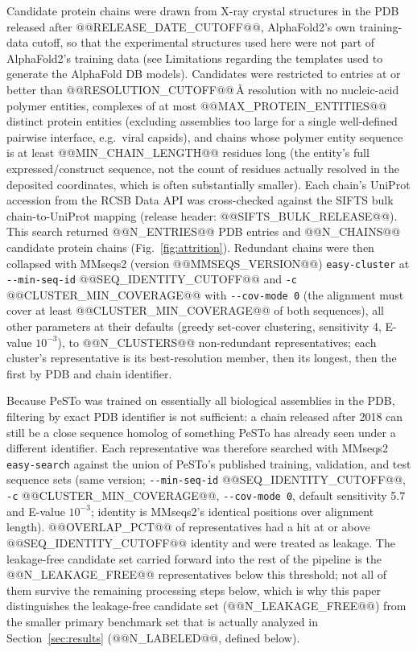 \documentclass[10pt]{article}
\begin{document}
Candidate protein chains were drawn from X-ray crystal structures in the PDB
released after @@RELEASE_DATE_CUTOFF@@, AlphaFold2's own training-data
cutoff, so that the experimental structures used here were not part of
AlphaFold2's training data (see Limitations regarding the templates used to
generate the AlphaFold DB models). Candidates were restricted to entries at
or better than @@RESOLUTION_CUTOFF@@\,\r{A} resolution with no nucleic-acid
polymer entities, complexes of at most @@MAX_PROTEIN_ENTITIES@@ distinct
protein entities (excluding assemblies too large for a single well-defined
pairwise interface, e.g.\ viral capsids), and chains whose polymer entity
sequence is at least @@MIN_CHAIN_LENGTH@@ residues long (the entity's full
expressed/construct sequence, not the count of residues actually resolved in
the deposited coordinates, which is often substantially smaller). Each
chain's UniProt accession from the RCSB Data API was cross-checked against
the SIFTS \cite{velankar2013} bulk chain-to-UniProt mapping (release
header: @@SIFTS_BULK_RELEASE@@). This search returned @@N_ENTRIES@@ PDB
entries and @@N_CHAINS@@ candidate protein chains (Fig.~\ref{fig:attrition}).
Redundant chains were then collapsed with MMseqs2 \cite{steinegger2017}
(version @@MMSEQS_VERSION@@) \texttt{easy-cluster} at
\texttt{-{}-min-seq-id} @@SEQ_IDENTITY_CUTOFF@@ and \texttt{-c}
@@CLUSTER_MIN_COVERAGE@@ with \texttt{-{}-cov-mode 0} (the alignment must cover
at least @@CLUSTER_MIN_COVERAGE@@ of both sequences), all other parameters at
their defaults (greedy set-cover clustering, sensitivity 4, E-value
$10^{-3}$), to @@N_CLUSTERS@@ non-redundant representatives; each cluster's
representative is its best-resolution member, then its longest, then the
first by PDB and chain identifier.

Because PeSTo was trained on essentially all biological assemblies in the PDB,
filtering by exact PDB identifier is not sufficient: a chain released after
2018 can still be a close sequence homolog of something PeSTo has already seen
under a different identifier. Each representative was therefore searched with
MMseqs2 \texttt{easy-search} against the union of PeSTo's published training,
validation, and test sequence sets (same version; \texttt{-{}-min-seq-id}
@@SEQ_IDENTITY_CUTOFF@@, \texttt{-c} @@CLUSTER_MIN_COVERAGE@@,
\texttt{-{}-cov-mode 0}, default sensitivity 5.7 and E-value $10^{-3}$;
identity is MMseqs2's identical positions over alignment length).
@@OVERLAP_PCT@@ of representatives had a hit at or above
@@SEQ_IDENTITY_CUTOFF@@ identity and were treated as leakage. The
leakage-free candidate set carried forward into the rest of the pipeline is
the @@N_LEAKAGE_FREE@@ representatives below this threshold; not all of them
survive the remaining processing steps below, which is why this paper
distinguishes the leakage-free candidate set (@@N_LEAKAGE_FREE@@) from the
smaller primary benchmark set that is actually analyzed in
Section~\ref{sec:results} (@@N_LABELED@@, defined below).
\end{document}
